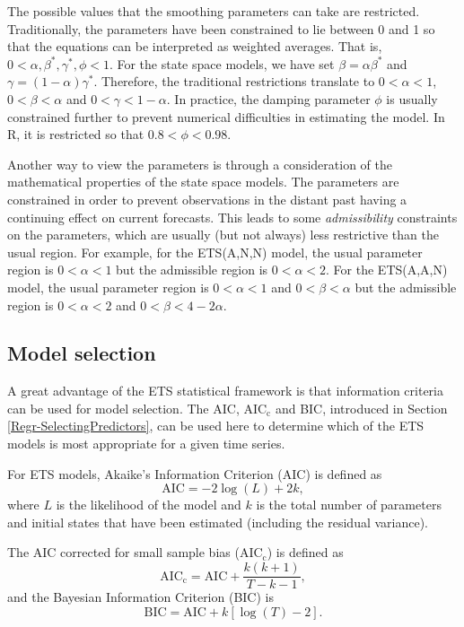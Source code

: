 \documentclass[]{book}
\begin{document}
The possible values that the smoothing parameters can take are restricted. Traditionally, the parameters have been constrained to lie between 0 and 1 so that the equations can be interpreted as weighted averages. That is, \(0< \alpha,\beta^*,\gamma^*,\phi<1\). For the state space models, we have set \(\beta=\alpha\beta^*\) and \(\gamma=(1-\alpha)\gamma^*\). Therefore, the traditional restrictions translate to \(0< \alpha <1\), \(0 < \beta < \alpha\) and \(0< \gamma < 1-\alpha\). In practice, the damping parameter \(\phi\) is usually constrained further to prevent numerical difficulties in estimating the model. In R, it is restricted so that \(0.8<\phi<0.98\).

Another way to view the parameters is through a consideration of the mathematical properties of the state space models. The parameters are constrained in order to prevent observations in the distant past having a continuing effect on current forecasts. This leads to some \emph{admissibility} constraints on the parameters, which are usually (but not always) less restrictive than the usual region. For example, for the ETS(A,N,N) model, the usual parameter region is \(0< \alpha <1\) but the admissible region is \(0< \alpha <2\). For the ETS(A,A,N) model, the usual parameter region is \(0<\alpha<1\) and \(0<\beta<\alpha\) but the admissible region is \(0<\alpha<2\) and \(0<\beta<4-2\alpha\).

\hypertarget{model-selection}{%
\subsection*{Model selection}\label{model-selection}}

A great advantage of the ETS statistical framework is that information criteria can be used for model selection. The AIC, AIC\(_{\text{c}}\) and BIC, introduced in Section \ref{Regr-SelectingPredictors}, can be used here to determine which of the ETS models is most appropriate for a given time series.

For ETS models, Akaike's Information Criterion (AIC) is defined as
\[
  \text{AIC} = -2\log(L) + 2k,
\]
where \(L\) is the likelihood of the model and \(k\) is the total number of parameters and initial states that have been estimated (including the residual variance).

The AIC corrected for small sample bias (AIC\(_\text{c}\)) is defined as
\[
  \text{AIC}_{\text{c}} = \text{AIC} + \frac{k(k+1)}{T-k-1},
\]
and the Bayesian Information Criterion (BIC) is
\[
  \text{BIC} = \text{AIC} + k[\log(T)-2].
\]
\end{document}
